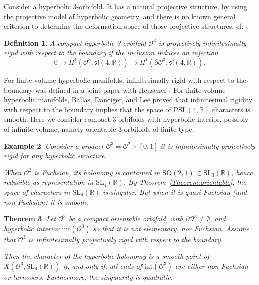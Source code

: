\documentclass[a4paper,11pt]{article}
\newtheorem{Theorem}{Theorem}[section]
\newtheorem{Definition}[Theorem]{Definition}
\newtheorem{Example}[Theorem]{Example}
\begin{document}
Consider a hyperbolic 3-orbifold. It has a natural 
projective structure, by using the projective model of hyperbolic geometry,
and there is no known general criterion to determine
the deformation space of those projective structures,
cf.~\cite{CLT1, CLT2, HeusenerPorti11}.
%

\begin{Definition}
A compact hyperbolic 3-orbifold $\mathcal O^3$ is projectively infinitesimally rigid 
with respect to the boundary if 
the inclusion induces an injection
$$
0\to H^1(\mathcal O^3,\mathfrak{sl}(4,
\mathbb R)) \to 
H^1(\partial \mathcal O^3,\mathfrak{sl}(4,
\mathbb R)).
$$
\end{Definition}

For finite volume hyperbolic manifolds, infinitesimally rigid 
with respect to the boundary  was defined  in a joint paper with Heusener 
\cite{HeusenerPorti11}. 
For finite volume hyperbolic manifolds, Ballas,  Danciger,  and Lee 
\cite[Theorem~3.2]{BDL}
proved that infinitesimal rigidity with respect to the boundary implies that the space of 
$\mathrm{PSL}(4,\mathbb R)$ characters is smooth.
Here we consider compact 3-orbifolds with hyperbolic interior, possibly of infinite volume, namely orientable 3-orbifolds of finite type.


\begin{Example}
 Consider a product $\mathcal O^3=\mathcal O^2\times [0,1]$ it is infinitesimally
 projectively rigid for any hyperbolic structure. 
 
When $\mathcal O^2$ is Fuchsian, 
its holonomy is contained in 
$\mathrm{SO}(2,1)\subset\mathrm{SL}_3(\mathbb R)$, hence reducible as representation in 
$\mathrm{SL}_4(\mathbb R)$.  By Theorem~\ref{Theorem:orientable},  the space of characters in 
 $\mathrm{SL}_4(\mathbb R)$ is singular. But when it is quasi-Fuchsian (and non-Fuchsian) it is smooth.
\end{Example}





\begin{Theorem}
\label{Theorem:3dim}
Let $\mathcal O^3$ be a compact orientable orbifold, with $\partial \mathcal O^3\neq \emptyset$, and hyperbolic interior
$\mathrm{int}( \mathcal O^3 )$ so  that it is not elementary, nor Fuchsian.
Assume that $\mathcal O^3$ is infinitesimally projectively rigid 
with respect to the boundary.

Then 
 the character of the
hyperbolic holonomy is a smooth point of
$X(\mathcal O^3, \mathrm{SL}_4(\mathbb R))$
if,  and only if,
all ends of 
$\mathrm{int}( \mathcal O^3 )$ are either non-Fuchsian or turnovers. Furthermore, the singularity is quadratic.
 \end{Theorem}
\end{document}
